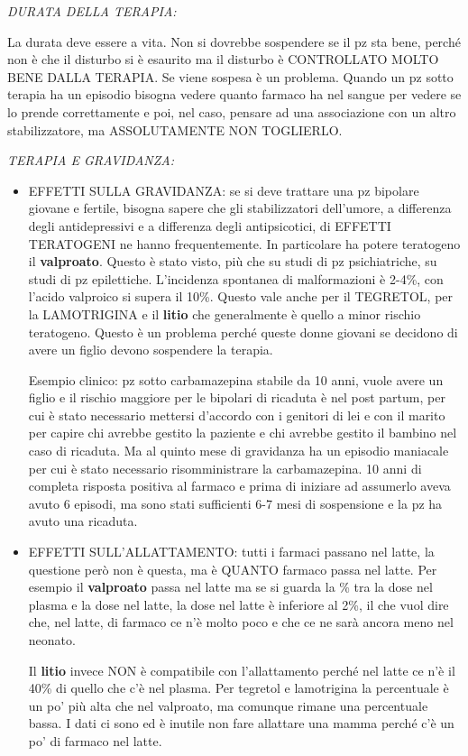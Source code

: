 \documentclass[]{article}
\begin{document}
\emph{DURATA DELLA TERAPIA:}

La durata deve essere a vita. Non si dovrebbe sospendere se il pz sta
bene, perché non è che il disturbo si è esaurito ma il disturbo è
CONTROLLATO MOLTO BENE DALLA TERAPIA. Se viene sospesa è un problema.
Quando un pz sotto terapia ha un episodio bisogna vedere quanto farmaco
ha nel sangue per vedere se lo prende correttamente e poi, nel caso,
pensare ad una associazione con un altro stabilizzatore, ma
ASSOLUTAMENTE NON TOGLIERLO.

\emph{TERAPIA E GRAVIDANZA:}

\begin{itemize}
\item
  EFFETTI SULLA GRAVIDANZA: se si deve trattare una pz bipolare giovane
  e fertile, bisogna sapere che gli stabilizzatori dell'umore, a
  differenza degli antidepressivi e a differenza degli antipsicotici, di
  EFFETTI TERATOGENI ne hanno frequentemente. In particolare ha potere
  teratogeno il \textbf{valproato}. Questo è stato visto, più che su
  studi di pz psichiatriche, su studi di pz epilettiche. L'incidenza
  spontanea di malformazioni è 2-4\%, con l'acido valproico si supera il
  10\%. Questo vale anche per il TEGRETOL, per la LAMOTRIGINA e il
  \textbf{litio} che generalmente è quello a minor rischio teratogeno.
  Questo è un problema perché queste donne giovani se decidono di avere
  un figlio devono sospendere la terapia.

  Esempio clinico: pz sotto carbamazepina stabile da 10 anni, vuole
  avere un figlio e il rischio maggiore per le bipolari di ricaduta è
  nel post partum, per cui è stato necessario mettersi d'accordo con i
  genitori di lei e con il marito per capire chi avrebbe gestito la
  paziente e chi avrebbe gestito il bambino nel caso di ricaduta. Ma al
  quinto mese di gravidanza ha un episodio maniacale per cui è stato
  necessario risomministrare la carbamazepina. 10 anni di completa
  risposta positiva al farmaco e prima di iniziare ad assumerlo aveva
  avuto 6 episodi, ma sono stati sufficienti 6-7 mesi di sospensione e
  la pz ha avuto una ricaduta.
\item
  EFFETTI SULL'ALLATTAMENTO: tutti i farmaci passano nel latte, la
  questione però non è questa, ma è QUANTO farmaco passa nel latte. Per
  esempio il \textbf{valproato} passa nel latte ma se si guarda la \%
  tra la dose nel plasma e la dose nel latte, la dose nel latte è
  inferiore al 2\%, il che vuol dire che, nel latte, di farmaco ce n'è
  molto poco e che ce ne sarà ancora meno nel neonato.

  Il \textbf{litio} invece NON è compatibile con l'allattamento perché
  nel latte ce n'è il 40\% di quello che c'è nel plasma. Per tegretol e
  lamotrigina la percentuale è un po' più alta che nel valproato, ma
  comunque rimane una percentuale bassa. I dati ci sono ed è inutile non
  fare allattare una mamma perché c'è un po' di farmaco nel latte.
\end{itemize}
\end{document}
